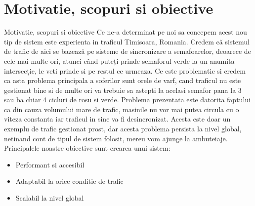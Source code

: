 \documentclass{beamer}
\begin{document}
\section{Motivatie, scopuri si obiective}
    \begin{frame}{Motivatie, scopuri si obiective}
        Ce ne-a determinat pe noi sa concepem acest nou tip de sistem este
        experienta in traficul Timisoara, Romania. 
        Credem că sistemul de trafic de aici se bazează pe sisteme de sincronizare a semafoarelor,
        deoarece de cele mai multe ori, atunci când puteți prinde semaforul
        verde la un anumita intersecție, le veti prinde si pe restul ce urmeaza.
        Ce este problematic si credem ca asta problema principala a soferilor 
        sunt orele de varf, cand traficul nu este gestionat bine si de 
        multe ori va trebuie sa astepti la acelasi semafor pana la 3 sau ba 
        chiar 4 cicluri de rosu si verde. Problema prezentata este datorita faptului 
        ca din cauza volumului mare de trafic, masinile nu vor mai putea circula 
        cu o viteza constanta iar traficul in sine va fi desincronizat.
        Acesta este doar un exemplu de trafic gestionat prost, dar 
        acesta problema persista la nivel global, netinand cont de 
        tipul de sistem folosit, mereu vom ajunge la ambuteiaje. 
        Principalele noastre obiective sunt crearea unui sistem:

        \begin{itemize}[<+-| alert@+>]
            \item Performant si accesibil
            \item Adaptabil la orice conditie de trafic
            \item Scalabil la nivel global
            
        \end{itemize}

    \end{frame}
\end{document}

